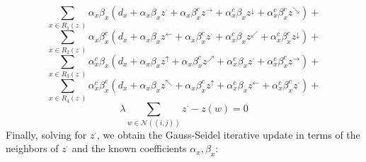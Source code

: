 \documentclass[11pt]{article}
\begin{document}
\begin{displaymath}
	\sum_{x\in R_{1}(z^{\cdot})} \alpha_{x}\beta_{x}(d_x + \alpha_{x}\beta_{x}z^{\cdot} + \alpha_{x}\beta_{x}^{c}z^{\rightarrow} + \alpha_{x}^{c}\beta_{x}z^{\downarrow} + \alpha_{x}^{c}\beta_{x}^{c}z^{\searrow}) +
\end{displaymath}
\begin{displaymath}
	\sum_{x\in R_{2}(z^{\cdot})}\alpha_{x}\beta_{x}^{c}(d_x + \alpha_{x}\beta_{x}z^{\leftarrow} + \alpha_{x}\beta_{x}^{c}z^{\cdot} + \alpha_{x}^{c}\beta_{x}z^{\swarrow} + \alpha_{x}^{c}\beta_{x}^{c}z^{\downarrow}) +
\end{displaymath}
\begin{displaymath}
	\sum_{x\in R_{3}(z^{\cdot})}\alpha_{x}^{c}\beta_{x}(d_x + \alpha_{x}\beta_{x}z^{\uparrow} + \alpha_{x}\beta_{x}^{c}z^{\nearrow} + \alpha_{x}^{c}\beta_{x}z^{\cdot} + \alpha_{x}^{c}\beta_{x}^{c}z^{\rightarrow})+
\end{displaymath}
\begin{displaymath}
	\sum_{x\in R_{4}(z^{\cdot})}\alpha_{x}^{c}\beta_{x}^{c}(d_x + \alpha_{x}\beta_{x}z^{\nwarrow} + \alpha_{x}\beta_{x}^{c}z^{\uparrow} + \alpha_{x}^{c}\beta_{x}z^{\leftarrow} + \alpha_{x}^{c}\beta_{x}^{c}z^{\cdot}) +
\end{displaymath}
\begin{displaymath}
	\lambda \sum_{w\in\mathcal{N}((i,j))} z^{\cdot}-z(w) = 0
\end{displaymath}
Finally, solving for $z^{\cdot}$, we obtain the Gauss-Seidel iterative update in terms of the neighbors of $z^{\cdot}$ and the known coefficients $\alpha_{x}, \beta_{x}$:
\end{document}
